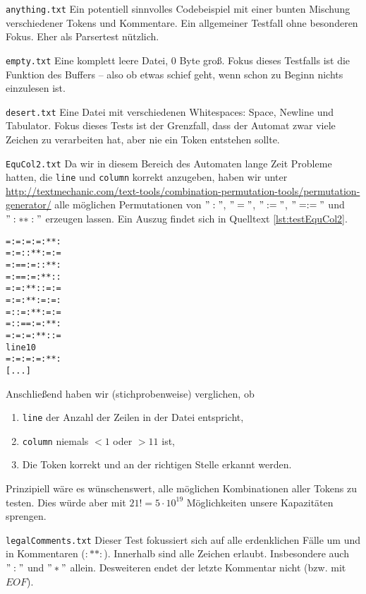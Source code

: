 \documentclass[
a4paper,   %
11pt,      %
oneside,   %
onecolumn, %
final      %
]{article}
\newcommand{\code}[1]{\lstinline$#1$}
\begin{document}
\begin{description}
\item{\texttt{anything.txt}} Ein potentiell sinnvolles Codebeispiel mit einer bunten Mischung verschiedener Tokens und Kommentare. Ein allgemeiner Testfall ohne besonderen Fokus. Eher als Parsertest nützlich.

\item{\texttt{empty.txt}} Eine komplett leere Datei, 0 Byte groß. Fokus dieses Testfalls ist die Funktion des Buffers -- also ob etwas schief geht, wenn schon zu Beginn nichts einzulesen ist.

\item{\texttt{desert.txt}} Eine Datei mit verschiedenen Whitespaces: Space, Newline und Tabulator. Fokus dieses Tests ist der Grenzfall, dass der Automat zwar viele Zeichen zu verarbeiten hat, aber nie ein Token entstehen sollte.

\item{\texttt{EquCol2.txt}} Da wir in diesem Bereich des Automaten lange Zeit Probleme hatten, die \code{line} und \code{column} korrekt anzugeben, haben wir unter \url{http://textmechanic.com/text-tools/combination-permutation-tools/permutation-generator/} alle möglichen Permutationen von $":"$, $"="$, $":="$, $"=:="$ und $":**:"$ erzeugen lassen. Ein Auszug findet sich in Quelltext \ref{lst:testEquCol2}.
\begin{lstlisting}[language=SysProgLang, caption={EquCol2.txt}, label=lst:testEquCol2]
=:=:=:=:**:
=:=::**:=:=
=:==:=::**:
=:==:=:**::
=:=:**::=:=
=:=:**:=:=:
=::=:**:=:=
=::==:=:**:
=:=:=:**::=
line10
=:=:=:=:**:
[...]
\end{lstlisting}
Anschließend haben wir (stichprobenweise) verglichen, ob
\begin{enumerate}
\item \code{line} der Anzahl der Zeilen in der Datei entspricht,
\item \code{column} niemals $< 1$ oder $> 11$ ist,
\item Die Token korrekt und an der richtigen Stelle erkannt werden.
\end{enumerate}
Prinzipiell wäre es wünschenswert, alle möglichen Kombinationen aller Tokens zu testen. Dies würde aber mit $21! = 5 \cdot 10^{19}$ Möglichkeiten unsere Kapazitäten sprengen.

\item{\texttt{legalComments.txt}} Dieser Test fokussiert sich auf alle erdenklichen Fälle um und in Kommentaren ($:* *:$). Innerhalb sind alle Zeichen erlaubt. Insbesondere auch $":"$ und $"*"$ allein. Desweiteren endet der letzte Kommentar nicht (bzw. mit $EOF$).


\end{description}
\end{document}
